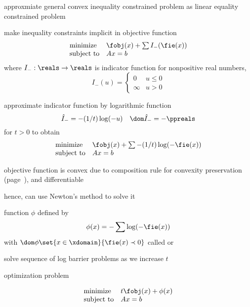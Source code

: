 \documentclass[17pt,landscape]{foils}
\begin{document}
{

\bit
\item
	approxmiate general convex inequality constrained problem as linear equality constrained problem

\vitem
	make inequality constraints implicit in objective function
	$$
		\begin{array}{ll}
			\mbox{minimize} &
				\fobj(x) + \sum I_-(\fie(x))
			\\
			\mbox{subject to} &
				Ax=b
		\end{array}
	$$
	where $I_-:\reals\to \reals$ is indicator function for nonpositive real numbers, \ie\
	$$
		I_{-}(u) = \left\{\begin{array}{ll}
			0	 & u\leq 0
			\\
			\infty	 & u> 0
		\end{array}\right.
	$$
\eit
\vfill



\bit
\item
	approximate indicator function by logarithmic function
	$$
		\hat{I}_- = -(1/t) \log(-u)
		\quad
		\dom \hat{I}_- = -\ppreals
	$$
	for $t>0$ to obtain
	$$
		\begin{array}{ll}
			\mbox{minimize} &
				\fobj(x) + \sum -(1/t) \log(-\fie(x))
			\\
			\mbox{subject to} &
				Ax=b
		\end{array}
	$$

\vitem
	objective function is convex due to composition rule for convexity preservation
	(page~\pageref{page:convexity preserving operation - composition}),
	and differentiable

\vitem
	hence, can use Newton's method to solve it

\vvitem
	function $\phi$ defined by
	$$
		\phi(x) = - \sum \log(-\fie(x))
	$$
	with $\dom \phi \set{x\in\xdomain}{\fie(x) \prec 0}$
	called  or 

\vitem
	solve sequence of log barrier problems as we increase $t$
\eit
\vfill



\bit
\item
	optimization problem

	$$
		\begin{array}{ll}
			\mbox{minimize} &
				t \fobj(x) + \phi(x)
			\\
			\mbox{subject to} &
				Ax = b
		\end{array}
	$$

}
\end{document}
